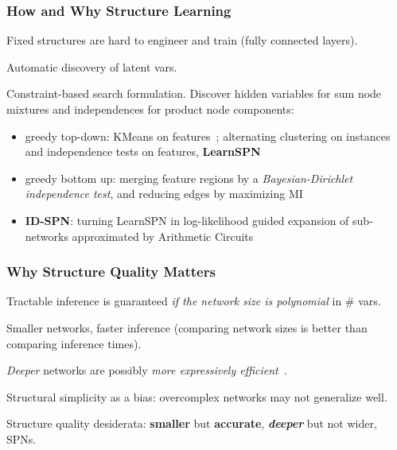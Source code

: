 \documentclass[xcolor={usenames,dvipsnames,svgnames}, compress]{beamer}
\begin{document}
\begin{frame}
  \frametitle{How and Why Structure Learning}
  \footnotesize
  Fixed structures are hard to engineer and train (fully connected layers).\par\bigskip
  
  Automatic discovery of latent vars.\par\bigskip

   Constraint-based search formulation. Discover hidden variables for sum node mixtures and independences
  for product node components:
  \begin{itemize}
    \itemsep 6pt
  \item greedy top-down: KMeans on features~\emph{\parencite{Dennis2012}}; alternating clustering on
    instances and independence tests on features, \textbf{LearnSPN}~\emph{\parencite{Gens2013}}

  \item greedy bottom up: merging feature regions by a \emph{Bayesian-Dirichlet independence test},  and reducing edges by maximizing MI\emph{~\parencite{Peharz2013}}

  

  \item \textbf{ID-SPN}: turning LearnSPN in log-likelihood guided expansion of sub-networks
    approximated by Arithmetic Circuits~\emph{\parencite{Rooshenas2014}}

  \end{itemize}
  \vspace{6pt}

  
\end{frame}

\begin{frame}
  \frametitle{Why Structure Quality Matters}

  \footnotesize
  
  Tractable inference is guaranteed \emph{if the network size is polynomial} in \#
  vars.\par\bigskip

  Smaller networks, faster inference (comparing network sizes is better than comparing inference times).\par\bigskip

  \emph{Deeper} networks are possibly \emph{more expressively efficient}~\emph{\parencite{Martens2014,Zhao2015}}.\par\bigskip

  Structural simplicity as a bias: overcomplex networks may not generalize well.\par\bigskip
  
  Structure quality desiderata: \textbf{\textbf{smaller}} but \textbf{\textbf{accurate}}, \textbf{\emph{deeper}} but not
  wider, SPNs.

  
  
\end{frame}
\end{document}

